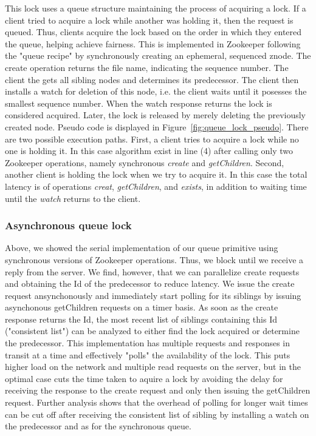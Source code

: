 This lock uses a queue structure maintaining the process of acquiring a lock. If a client tried to acquire a lock while another was holding it, then the request is queued. Thus, clients acquire the lock based on the order in which they entered the queue, helping achieve fairness. This is implemented in Zookeeper following the "queue recipe" by synchronously creating an ephemeral, sequenced znode. The create operation returns the file name, indicating the sequence number. The client the gets all sibling nodes and determines its predecessor. The client then installs a watch for deletion of this node, i.e. the client waits until it posesses the smallest sequence number. When the watch response returns the lock is considered acquired. Later, the lock is released by merely deleting the previously created node. Pseudo code is displayed in Figure~\ref{fig:queue_lock_pseudo}. There are two possible execution paths. First, a client tries to acquire a lock while no one is holding it. In this case algorithm exist in line (4) after calling only two Zookeeper operations, namely synchronous \emph{create} and \emph{getChildren}. Second, another client is holding the lock when we try to acquire it. In this case the total latency is of operations \emph{creat}, \emph{getChildren}, and \emph{exists}, in addition to waiting time until the \emph{watch} returns to the client.

\subsubsection{Asynchronous queue lock}

Above, we showed the serial implementation of our queue primitive using synchronous versions of Zookeeper operations. Thus, we block until we receive a reply from the server. We find, however, that we can parallelize create requests and obtaining the Id of the predecessor to reduce latency. We issue the create request ansynchonously and immediately start polling for its siblings by issuing asynchonous getChildren requests on a timer basis. As soon as the create response returns the Id, the most recent list of siblings containing this Id ("consistent list") can be analyzed to either find the lock acquired or determine the predecessor. This implementation has multiple requests and responses in transit at a time and effectively "polls" the availability of the lock. This puts higher load on the network and multiple read requests on the server, but in the optimal case cuts the time taken to aquire a lock by avoiding the delay for receiving the response to the create request and only then issuing the getChildren request. Further analysis shows that the overhead of polling for longer wait times can be cut off after receiving the consistent list of sibling by installing a watch on the predecessor and as for the synchronous queue.

